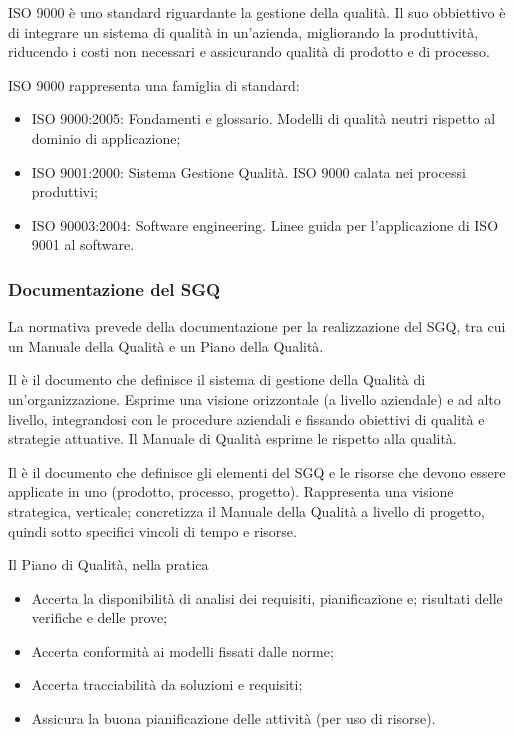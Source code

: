 ISO 9000 è uno standard riguardante la gestione della qualità. Il suo obbiettivo
è di integrare un sistema di qualità in un'azienda, migliorando la produttività,
riducendo i costi non necessari e assicurando qualità di prodotto e di processo.

ISO 9000 rappresenta una famiglia di standard:

\begin{itemize}
  \item ISO 9000:2005: Fondamenti e glossario. Modelli di qualità neutri
    rispetto al dominio di applicazione;
  \item ISO 9001:2000: Sistema Gestione Qualità. ISO 9000 calata nei processi
    produttivi;
  \item ISO 90003:2004: Software engineering. Linee guida per l'applicazione di
    ISO 9001 al software.
\end{itemize}

\subsubsection{Documentazione del SGQ} %
\label{ssub:documentazione_del_sgq}

La normativa prevede della documentazione per la realizzazione del SGQ, tra cui
un Manuale della Qualità e un Piano della Qualità.

Il  è il documento che definisce il sistema di
gestione della Qualità di un'organizzazione. Esprime una visione orizzontale (a
livello aziendale) e ad alto livello, integrandosi con le procedure aziendali e
fissando obiettivi di qualità e strategie attuative. Il Manuale di Qualità
esprime le  rispetto alla qualità.

Il  è il documento che definisce gli elementi del
SGQ e le risorse che devono essere applicate in uno 
(prodotto, processo, progetto). Rappresenta una visione strategica, verticale;
concretizza il Manuale della Qualità a livello di progetto, quindi sotto
specifici vincoli di tempo e risorse.

Il Piano di Qualità, nella pratica

\begin{itemize}
  \item Accerta la disponibilità di analisi dei requisiti, pianificazione e;
  risultati delle verifiche e delle prove;
  \item Accerta conformità ai modelli fissati dalle norme;
  \item Accerta tracciabilità da soluzioni e requisiti;
  \item Assicura la buona pianificazione delle attività (per uso di risorse).
\end{itemize}

